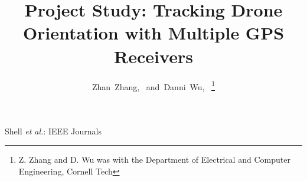 \documentclass[journal,onecolumn]{IEEEtran}
\begin{document}
%
\title{Project Study: Tracking Drone Orientation with Multiple GPS Receivers}
%
%
%

\author{Zhan~Zhang,~
        and~Danni~Wu,~
\thanks{Z. Zhang and D. Wu was with the Department
of Electrical and Computer Engineering, Cornell Tech}%
}

%
%



%
{Shell \MakeLowercase{\textit{et al.}}: IEEE Journals}
%
\end{document}
